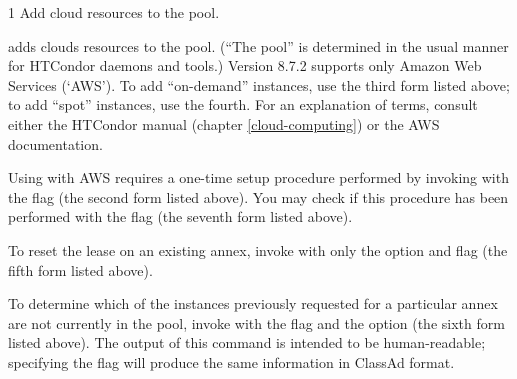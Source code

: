 \begin{ManPage}{\label{man-condor-annex}}{1}
{Add cloud resources to the pool.}

\Synopsis

 

 

 

 



 

\Description

 adds clouds resources to the pool.  (``The pool'' is determined
in the usual manner for HTCondor daemons and tools.)  Version 8.7.2 supports
only Amazon Web Services (`AWS').  To add ``on-demand'' instances, use
the third form listed above; to add ``spot'' instances, use the fourth.  For an
explanation of terms, consult either the HTCondor manual
(chapter \ref{cloud-computing}) or the AWS documentation.

Using  with AWS requires a one-time setup procedure
performed by invoking  with the  flag
(the second form listed above).  You may check if this procedure has been
performed with the  flag (the seventh form listed above).

To reset the lease on an existing annex, invoke  with
only the  option and  flag (the fifth form
listed above).

To determine which of the instances previously requested for a
particular annex are not currently in the pool, invoke 
with the  flag and the  option (the sixth
form listed above).  The output of this command is intended to be
human-readable; specifying the  flag will produce the
same information in ClassAd format.


\end{ManPage}
